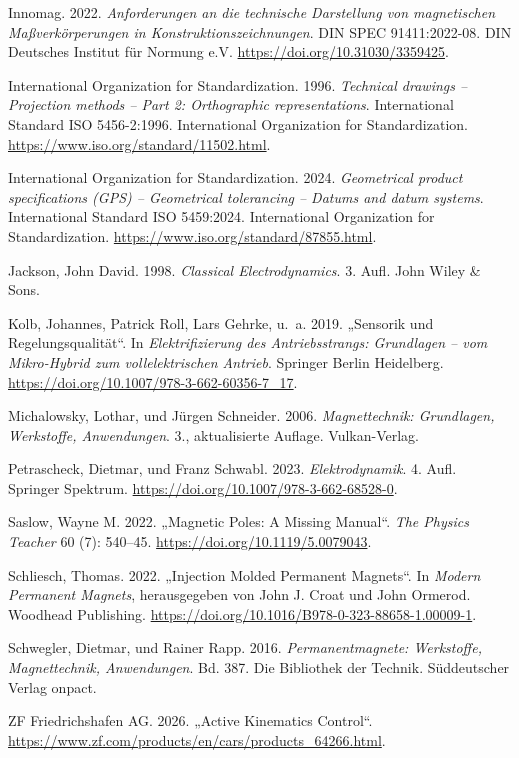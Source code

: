 \documentclass[
  ngerman,
  a4paper,
  twoside]{scrbook}
\newlength{\cslhangindent}
\newenvironment{CSLReferences}[2] %
 {\begin{list}{}{%
  \setlength{\itemindent}{0pt}
  \setlength{\leftmargin}{0pt}
  \setlength{\parsep}{0pt}
  \ifodd #1
   \setlength{\leftmargin}{\cslhangindent}
   \setlength{\itemindent}{-1\cslhangindent}
  \fi
  \setlength{\itemsep}{#2\baselineskip}}}
 {\end{list}}
\begin{document}
\begin{CSLReferences}{1}{1}
Innomag. 2022. \emph{Anforderungen an die technische Darstellung von
magnetischen Maßverkörperungen in Konstruktionszeichnungen}. DIN SPEC
91411:2022-08. DIN Deutsches Institut für Normung e.V.
\url{https://doi.org/10.31030/3359425}.

International Organization for Standardization. 1996. \emph{{Technical
drawings -- Projection methods -- Part 2: Orthographic
representations}}. International Standard ISO 5456-2:1996. International
Organization for Standardization.
\url{https://www.iso.org/standard/11502.html}.

International Organization for Standardization. 2024. \emph{{Geometrical
product specifications (GPS) -- Geometrical tolerancing -- Datums and
datum systems}}. International Standard ISO 5459:2024. International
Organization for Standardization.
\url{https://www.iso.org/standard/87855.html}.

Jackson, John David. 1998. \emph{Classical Electrodynamics}. 3. Aufl.
John Wiley \& Sons.

Kolb, Johannes, Patrick Roll, Lars Gehrke, u.~a. 2019. {„Sensorik und
Regelungsqualität``}. In \emph{Elektrifizierung des Antriebsstrangs:
Grundlagen -- vom Mikro-Hybrid zum vollelektrischen Antrieb}. Springer
Berlin Heidelberg. \url{https://doi.org/10.1007/978-3-662-60356-7_17}.

Michalowsky, Lothar, und Jürgen Schneider. 2006. \emph{Magnettechnik:
Grundlagen, Werkstoffe, Anwendungen}. 3., aktualisierte Auflage.
Vulkan-Verlag.

Petrascheck, Dietmar, und Franz Schwabl. 2023. \emph{Elektrodynamik}. 4.
Aufl. Springer Spektrum.
\url{https://doi.org/10.1007/978-3-662-68528-0}.

Saslow, Wayne M. 2022. {„Magnetic Poles: A Missing Manual``}. \emph{The
Physics Teacher} 60 (7): 540--45.
\url{https://doi.org/10.1119/5.0079043}.

Schliesch, Thomas. 2022. {„Injection Molded Permanent Magnets``}. In
\emph{Modern Permanent Magnets}, herausgegeben von John J. Croat und
John Ormerod. Woodhead Publishing.
\url{https://doi.org/10.1016/B978-0-323-88658-1.00009-1}.

Schwegler, Dietmar, und Rainer Rapp. 2016. \emph{Permanentmagnete:
Werkstoffe, Magnettechnik, Anwendungen}. Bd. 387. Die Bibliothek der
Technik. Süddeutscher Verlag onpact.

ZF Friedrichshafen AG. 2026. {„Active Kinematics Control``}.
\url{https://www.zf.com/products/en/cars/products_64266.html}.

\end{CSLReferences}


\backmatter
\end{document}
